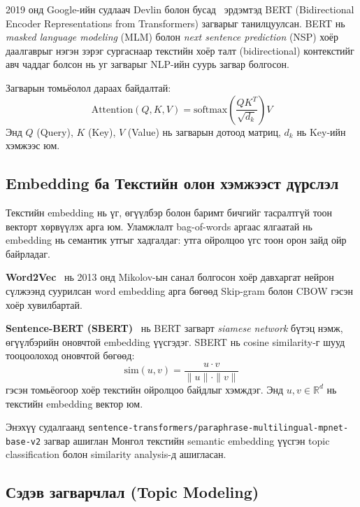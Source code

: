 2019 онд Google-ийн судлаач Devlin болон бусад~\cite{devlin2019bert} эрдэмтэд BERT (Bidirectional Encoder Representations from Transformers) загварыг танилцуулсан. BERT нь \textit{masked language modeling} (MLM) болон \textit{next sentence prediction} (NSP) хоёр даалгаврыг нэгэн зэрэг сургаснаар текстийн хоёр талт (bidirectional) контекстийг авч чаддаг болсон нь уг загварыг NLP-ийн суурь загвар болгосон.

Загварын томьёолол дараах байдалтай:
\begin{equation}
    \text{Attention}(Q, K, V) = \text{softmax}\left(\frac{QK^T}{\sqrt{d_k}}\right)V
\end{equation}
Энд $Q$ (Query), $K$ (Key), $V$ (Value) нь загварын дотоод матриц, $d_k$ нь Key-ийн хэмжээс юм.

\subsection{Embedding ба Текстийн олон хэмжээст дүрслэл}

Текстийн embedding нь үг, өгүүлбэр болон баримт бичгийг тасралтгүй тоон векторт хөрвүүлэх арга юм. Уламжлалт bag-of-words аргаас ялгаатай нь embedding нь семантик утгыг хадгалдаг: утга ойролцоо үгс тоон орон зайд ойр байрладаг.

\textbf{Word2Vec}~\cite{mikolov2013word2vec} нь 2013 онд Mikolov-ын санал болгосон хоёр давхаргат нейрон сүлжээнд суурилсан word embedding арга бөгөөд Skip-gram болон CBOW гэсэн хоёр хувилбартай.

\textbf{Sentence-BERT (SBERT)}~\cite{reimers2019sbert} нь BERT загварт \textit{siamese network} бүтэц нэмж, өгүүлбэрийн оновчтой embedding үүсгэдэг. SBERT нь cosine similarity-г шууд тооцоолоход оновчтой бөгөөд:
\begin{equation}
    \text{sim}(u, v) = \frac{u \cdot v}{\|u\| \cdot \|v\|}
\end{equation}
гэсэн томьёогоор хоёр текстийн ойролцоо байдлыг хэмждэг. Энд $u, v \in \mathbb{R}^d$ нь текстийн embedding вектор юм.

Энэхүү судалгаанд \texttt{sentence-transformers/paraphrase-multilingual-mpnet-base-v2} загвар ашиглан Монгол текстийн semantic embedding үүсгэн topic classification болон similarity analysis-д ашигласан.

\subsection{Сэдэв загварчлал (Topic Modeling)}

